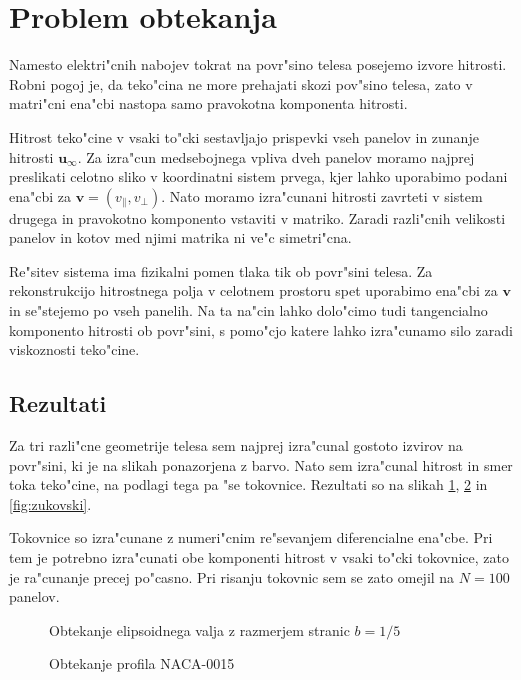 \documentclass[a4paper,10pt]{article}
\renewcommand{\vec}{\mathbf}
\begin{document}
\section{Problem obtekanja}

Namesto elektri"cnih nabojev tokrat na povr"sino telesa posejemo izvore hitrosti. Robni pogoj je, da teko"cina ne more prehajati skozi pov"sino telesa, zato v matri"cni ena"cbi nastopa samo pravokotna komponenta hitrosti. 

Hitrost teko"cine v vsaki to"cki sestavljajo prispevki vseh panelov in zunanje hitrosti $\vec u_\infty$. Za izra"cun medsebojnega vpliva dveh panelov moramo najprej preslikati celotno sliko v koordinatni sistem prvega, kjer lahko uporabimo podani ena"cbi za $\vec v = (v_\parallel,v_\perp)$. Nato moramo izra"cunani hitrosti zavrteti v sistem drugega in pravokotno komponento vstaviti v matriko. Zaradi razli"cnih velikosti panelov in kotov med njimi matrika ni ve"c simetri"cna. 

Re"sitev sistema ima fizikalni pomen tlaka tik ob povr"sini telesa. Za rekonstrukcijo hitrostnega polja v celotnem prostoru spet uporabimo ena"cbi za $\vec v$ in se"stejemo po vseh panelih. Na ta na"cin lahko dolo"cimo tudi tangencialno komponento hitrosti ob povr"sini, s pomo"cjo katere lahko izra"cunamo silo zaradi viskoznosti teko"cine. 

\subsection{Rezultati}

Za tri razli"cne geometrije telesa sem najprej izra"cunal gostoto izvirov na povr"sini, ki je na slikah ponazorjena z barvo. Nato sem izra"cunal hitrost in smer toka teko"cine, na podlagi tega pa "se tokovnice. Rezultati so na slikah \ref{fig:elipsoid}, \ref{fig:naca} in \ref{fig:zukovski}. 

Tokovnice so izra"cunane z numeri"cnim re"sevanjem diferencialne ena"cbe. Pri tem je potrebno izra"cunati obe komponenti hitrost v vsaki to"cki tokovnice, zato je ra"cunanje precej po"casno. Pri risanju tokovnic sem se zato omejil na $N=100$ panelov. 

\begin{figure}[H]
 \subfigure{}
 \subfigure{}
 \caption{Obtekanje elipsoidnega valja z razmerjem stranic $b = 1/5$}
 \label{fig:elipsoid}
\end{figure}

\begin{figure}[H]
 \subfigure{}
 \subfigure{}
 \caption{Obtekanje profila NACA-0015}
 \label{fig:naca}
\end{figure}
\end{document}
